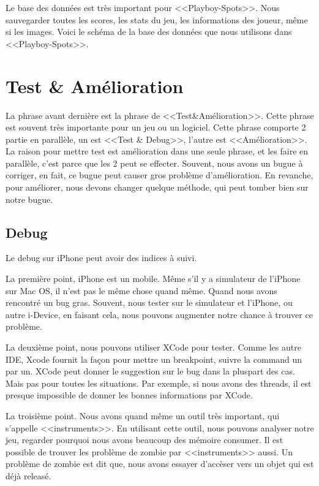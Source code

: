 Le base des données est très important pour <<Playboy-Spots>>. Nous sauvegarder toutes les scores, les stats du jeu, les informations des joueur, même si les images. 
Voici le schéma de la base des données que nous utilisons dans <<Playboy-Spots>>.





\section{Test \& Amélioration} %
\label{sec:test_&_amélioration}

La phrase avant dernière est la phrase de <<Test\&Amélioration>>. Cette phrase est souvent très importante pour un jeu ou un logiciel. Cette phrase comporte 2 partie en parallèle, un est <<Test \& Debug>>, l'autre est <<Amélioration>>. La raison pour mettre test est amélioration dans une seule phrase, et les faire en parallèle, c'est parce que les 2 peut se effecter. Souvent, nous avons un bugue à corriger, en fait, ce bugue peut causer gros problème d'amélioration. En revanche, pour améliorer, nous devons changer quelque méthode, qui peut tomber bien sur notre bugue.

\subsection{Debug} %
\label{sub:debug}

Le debug sur iPhone peut avoir des indices à suivi. 

La première point, iPhone est un mobile. Même s'il y a simulateur de l'iPhone sur Mac OS, il n'est pas le même chose quand même. Quand nous avons rencontré un bug gras. Souvent, nous tester sur le simulateur et l'iPhone, ou autre i-Device, en faisant cela, nous pouvons augmenter notre chance à trouver ce problème. 

La deuxième point, nous pouvons utiliser XCode pour tester. Comme les autre IDE, Xcode fournit la façon pour mettre un breakpoint, suivre la command un par un. XCode peut donner le suggestion sur le bug dans la pluspart des cas. Mais pas pour toutes les situations. Par exemple, si nous avons des threads, il est presque impossible de donner les bonnes informations par XCode. 

La troisième point. Nous avons quand même un outil très important, qui s'appelle <<instruments>>. En utilisant cette outil, nous pouvons analyser notre jeu, regarder pourquoi nous avons beaucoup des mémoire consumer. Il est possible de trouver les problème de zombie par <<instruments>> aussi. Un problème de zombie est dit que, nous avons essayer d'accèser vers un objet qui est déjà releasé.

